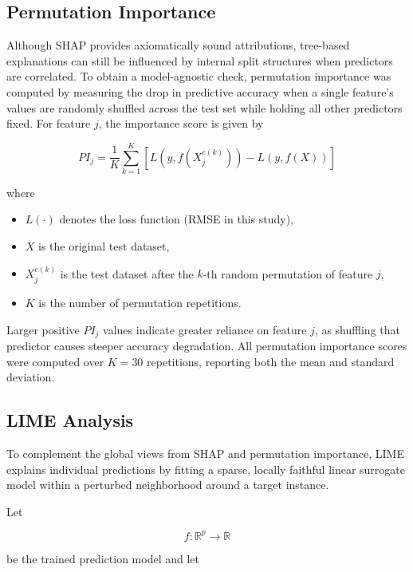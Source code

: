 \subsection{Permutation Importance}

Although SHAP provides axiomatically sound attributions, tree-based explanations can still be influenced by internal split structures when predictors are correlated. To obtain a model-agnostic check, permutation importance was computed by measuring the drop in predictive accuracy when a single feature's values are randomly shuffled across the test set while holding all other predictors fixed. For feature $j$, the importance score is given by

\begin{equation}
PI_j
=
\frac{1}{K}
\sum_{k=1}^{K}
\left[
L\!\left(
y,
f(X_j^{e(k)})
\right)
-
L\!\left(
y,
f(X)
\right)
\right]
\label{eq:pi}
\end{equation}

where

\begin{itemize}
\item $L(\cdot)$ denotes the loss function (RMSE in this study),
\item $X$ is the original test dataset,
\item $X_j^{e(k)}$ is the test dataset after the $k$-th random permutation of feature $j$,
\item $K$ is the number of permutation repetitions.
\end{itemize}

Larger positive $PI_j$ values indicate greater reliance on feature $j$, as shuffling that predictor causes steeper accuracy degradation. All permutation importance scores were computed over $K=30$ repetitions, reporting both the mean and standard deviation.


\subsection{LIME Analysis}

To complement the global views from SHAP and permutation importance, LIME explains individual predictions by fitting a sparse, locally faithful linear surrogate model within a perturbed neighborhood around a target instance.

Let

\[
f:\mathbb{R}^{p}\rightarrow\mathbb{R}
\]

be the trained prediction model and let

